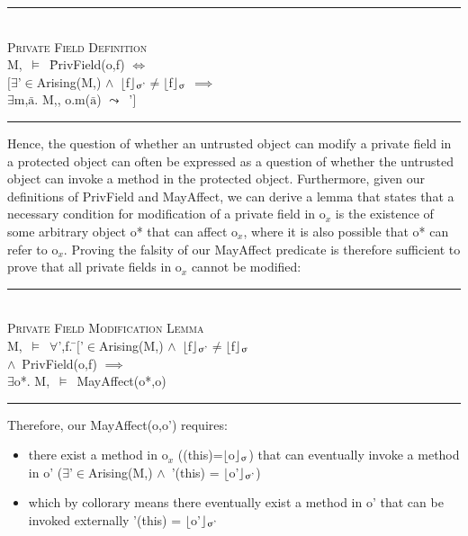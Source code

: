 \documentclass[a4paper,11pt, twoside,twocolumn]{article}
\newenvironment{logic}
{\begin{minipage}[c]{\linewidth}  \small \vspace{0.5em}\begin{tabbing}}
{\end{tabbing}\end{minipage}\vspace{0.5em}}
\newcommand{\loin}{$\in$}
\newcommand{\loforall}{$\forall$}
\newcommand{\loexists}{$\exists$}
\newcommand{\loand}{$\land$}
\newcommand{\loneq} {$\neq$}
\newcommand{\loimplies}{$\implies$}
\newcommand{\losigma}{\text{$\upsigma$}}
\newcommand{\loturns} {$\vDash$}
\newcommand{\loiff} {$\iff$}
\newcommand{\loleadsto} {$\leadsto$}
\newcommand{\loexec}[2] {$\lfloor$#1$\rfloor _{\text{#2}}$}
\newcommand{\loconj}[1] {$\bar{\text{#1}}$}
\newcommand{\hr}{\rule{\linewidth}{0.4pt}}
\begin{document}
\begin{logic}
\hr\\
\textsc{\normalsize *Private Field Definition}\\\vspace{0.5em}
M,\losigma\ \loturns\ \=PrivField(o,f) \loiff\\
\>$[$\loexists \losigma'\loin Arising(M,\losigma) \loand\ \loexec{f}{\losigma'}\loneq\loexec{f}{\losigma} \loimplies \\
\> \loexists m,\loconj{a}. M,\losigma, o.m(\loconj{a}) \loleadsto\ \losigma'$]$\\
\hr
\end{logic}
Hence, the question of whether an untrusted object can modify a private field in a protected object can often be expressed as a question of whether the untrusted object can invoke a method in the protected object. Furthermore, given our definitions of PrivField and MayAffect, we can derive a lemma that states that a necessary condition for modification of a private field in o$_x$ is the existence of some arbitrary object o* that can affect o$_x$, where it is also possible that o* can refer to o$_x$. Proving the falsity of our MayAffect predicate is therefore sufficient to prove that all private fields in o$_x$ cannot be modified:
\begin{logic}
\hr\\
\textsc{\normalsize *Private Field Modification Lemma}\\\vspace{0.5em}
M,\losigma\ \loturns\ \loforall \losigma',f. \=$[$\losigma'\loin Arising(M,\losigma) \loand\ \loexec{f}{\losigma'}\loneq\loexec{f}{\losigma}\\
\>\loand\ PrivField(o,f) \loimplies \\
\>\loexists o*. M,\losigma\ \loturns\ MayAffect(o*,o)\\
\hr
\end{logic}

Therefore, our MayAffect(o,o') requires:
\begin{itemize}
\item there exist a method in o$_x$ (\losigma(this)=\loexec{o}{\losigma}) that can eventually invoke a method in o' (\loexists \losigma'\loin Arising(M,\losigma) \loand\ \losigma'(this) = \loexec{o'}{\losigma'})
\item which by collorary means there eventually exist a method in o' that can be invoked externally \losigma'(this) = \loexec{o'}{\losigma'}
\end{itemize}
\end{document}
